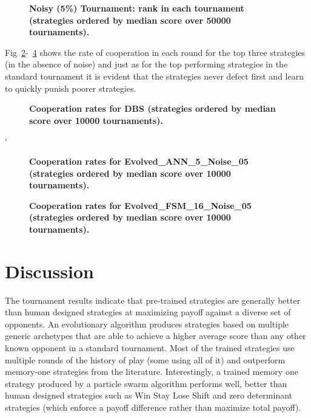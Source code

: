 \documentclass[10pt,letterpaper]{article}
\begin{document}
\begin{figure}[!hbtp]
    \centering
    \caption{\bf Noisy (5\%) Tournament: rank in each tournament 
        (strategies ordered by median score over 50000 tournaments).}
    \label{fig:noisy_ranks_boxplot}
\end{figure}

Fig~\ref{fig:comparison_cooperation_heatmaps_noisy_1}-~\ref{fig:comparison_cooperation_heatmaps_noisy_3} shows the rate of
cooperation in each round for the top three strategies (in the absence of noise)
and just as for the top performing strategies in the standard tournament
it is evident that
the strategies never defect first and learn to quickly punish poorer strategies.

\begin{figure}[!hbtp]
        \centering
        \caption{\bf Cooperation rates for DBS
            (strategies ordered by median score over 10000 tournaments).}
        \label{fig:comparison_cooperation_heatmaps_noisy_1}
\end{figure}
        `
\begin{figure}[!hbtp]
        \centering
        \caption{\bf Cooperation rates for Evolved\_ANN\_5\_Noise\_05
            (strategies ordered by median score over 10000 tournaments).}
        \label{fig:comparison_cooperation_heatmaps_noisy_2}
\end{figure}

\begin{figure}[!hbtp]
        \centering
        \caption{\bf Cooperation rates for Evolved\_FSM\_16\_Noise\_05
            (strategies ordered by median score over 10000 tournaments).}
        \label{fig:comparison_cooperation_heatmaps_noisy_3}
\end{figure}



\section*{Discussion}

The tournament results indicate that pre-trained strategies are generally better
than human designed strategies at maximizing payoff against a diverse set of
opponents. An evolutionary algorithm produces strategies based on multiple
generic archetypes that are able to achieve a higher average
score than any other known opponent in a standard tournament. Most of the trained
strategies use multiple rounds of the history of play (some using all of it) and
outperform memory-one strategies from the literature. Interestingly, a trained
memory one strategy produced by a particle swarm algorithm performs well, better
than human designed strategies such as Win Stay Lose Shift and zero determinant
strategies (which enforce a payoff difference rather than maximize total payoff).
\end{document}
